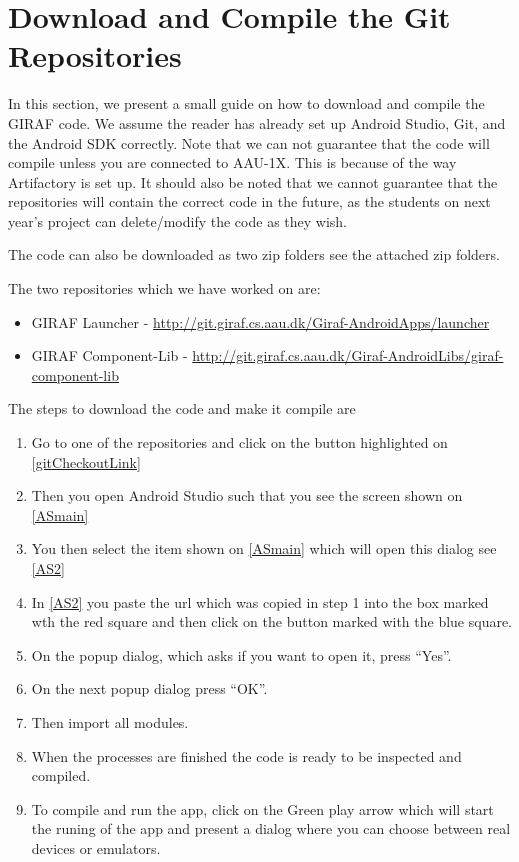 \section{Download and Compile the Git Repositories}
In this section, we present a small guide on how to download and compile the
GIRAF code. We assume the reader has already set up Android Studio, Git, and the
Android SDK correctly. Note that we can not guarantee that the code will compile
unless you are connected to AAU-1X. This is because of the way Artifactory is
set up. It should also be noted that we cannot guarantee that the
repositories will contain the correct code in the future, as the students on
next year's project can delete/modify the code as they wish.\nl

The code can also be downloaded as two zip folders see the attached zip folders.\nl

The two repositories which we have worked on are:

\begin{itemize}
  \item GIRAF Launcher -
  \url{http://git.giraf.cs.aau.dk/Giraf-AndroidApps/launcher}
  \item GIRAF Component-Lib -
  \url{http://git.giraf.cs.aau.dk/Giraf-AndroidLibs/giraf-component-lib}
\end{itemize}

The steps to download the code and make it compile are
\begin{enumerate}
  \item Go to one of the repositories and click on the button highlighted on
  \autoref{gitCheckoutLink}
  \item Then you open Android Studio such that you see the screen shown on
  \autoref{ASmain}
  \item You then select the item shown on \autoref{ASmain} which will open this
  dialog see \autoref{AS2}
  \item In \autoref{AS2} you paste the url which was copied
  in step 1 into the box marked wth the red square and then click on the button
  marked with the blue square. 
  \item On the popup dialog, which asks if you want to open it, press ``Yes''.
  \item On the next popup dialog press ``OK''.
  \item Then import all modules.
  \item When the processes are finished the code is ready to be inspected
  and compiled.
  \item To compile and run the app, click on the Green play arrow which
  will start the runing of the app and present a dialog where you can choose
  between real devices or emulators.
\end{enumerate}





